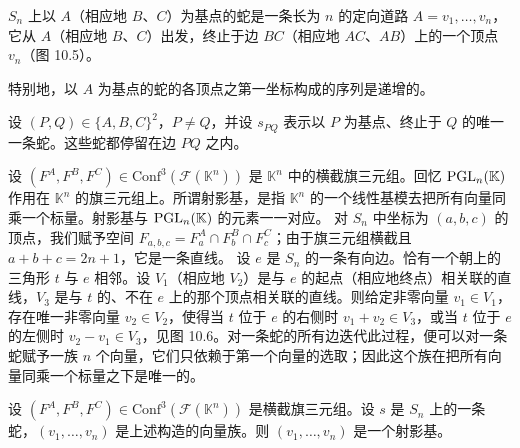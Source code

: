 \begin{definition}[10.24] $S_n$ 上以 $A$（相应地 $B$、$C$）为基点的蛇是一条长为 $n$ 的定向道路 $A=v_1,\dots,v_n$，它从 $A$（相应地 $B$、$C$）出发，终止于边 $BC$（相应地 $AC$、$AB$）上的一个顶点 $v_n$（图 10.5）。
\end{definition}

\begin{remark}[10.25] 特别地，以 $A$ 为基点的蛇的各顶点之第一坐标构成的序列是递增的。
\end{remark}


设 $(P,Q)\in\{A,B,C\}^2$，$P\ne Q$，并设 $s_{PQ}$ 表示以 $P$ 为基点、终止于 $Q$ 的唯一一条蛇。这些蛇都停留在边 $PQ$ 之内。


设 $(F^A,F^B,F^C)\in\mathrm{Conf}^3(\mathcal{F}(\mathbb{K}^n))$ 是 $\mathbb{K}^n$ 中的横截旗三元组。回忆 $\operatorname{PGL}_n(\mathbb{K})$ 作用在 $\mathbb{K}^n$ 的旗三元组上。所谓射影基，是指 $\mathbb{K}^n$ 的一个线性基模去把所有向量同乘一个标量。射影基与 $\operatorname{PGL}_n(\mathbb{K})$ 的元素一一对应。
对 $S_n$ 中坐标为 $(a,b,c)$ 的顶点，我们赋予空间 $F_{a,b,c}=F^A_a\cap F^B_b\cap F^C_c$；由于旗三元组横截且 $a+b+c=2n+1$，它是一条直线。
设 $e$ 是 $S_n$ 的一条有向边。恰有一个朝上的三角形 $t$ 与 $e$ 相邻。设 $V_1$（相应地 $V_2$）是与 $e$ 的起点（相应地终点）相关联的直线，$V_3$ 是与 $t$ 的、不在 $e$ 上的那个顶点相关联的直线。则给定非零向量 $v_1\in V_1$，存在唯一非零向量 $v_2\in V_2$，使得当 $t$ 位于 $e$ 的右侧时 $v_1+v_2\in V_3$，或当 $t$ 位于 $e$ 的左侧时 $v_2-v_1\in V_3$，见图 10.6。对一条蛇的所有边迭代此过程，便可以对一条蛇赋予一族 $n$ 个向量，它们只依赖于第一个向量的选取；因此这个族在把所有向量同乘一个标量之下是唯一的。


\begin{proposition}[10.26] 设 $(F^A,F^B,F^C)\in\mathrm{Conf}^3(\mathcal{F}(\mathbb{K}^n))$ 是横截旗三元组。设 $s$ 是 $S_n$ 上的一条蛇，$(v_1,\dots,v_n)$ 是上述构造的向量族。则 $(v_1,\dots,v_n)$ 是一个射影基。
\end{proposition}

